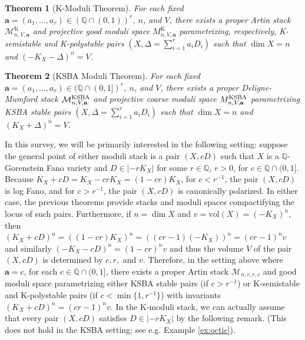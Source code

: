 \documentclass[11pt]{amsart}
\numberwithin{equation}{section}
\newtheorem{theorem}{Theorem}[section]
\theoremstyle{definition}
\newcommand{\bQ}{\mathbb{Q}}
\newcommand{\KSBA}{{\rm KSBA}}
\newcommand{\vol}{\mathrm{vol}}
\newcommand{\cM}{\mathcal M}
\newcommand{\K}{\mathrm{K}}
\begin{document}
\begin{theorem}[K-Moduli Theorem]\label{kmodthm}
    For each fixed $\mathbf{a} = (a_1, \dots, a_r) \in (\bQ\cap (0,1))^r$, $n$, and $V$, there exists a proper Artin stack $\cM^{\K}_{n,V,\mathbf{a}}$ and projective good moduli space $M^{\K}_{n,V,\mathbf{a}}$ parametrizing, respectively, K-semistable and K-polystable pairs $(X, \Delta = \sum_{i=1}^r a_i D_i)$ such that $\dim X = n$ and $(-K_X - \Delta)^n = V$.
\end{theorem}

\begin{theorem}[KSBA Moduli Theorem]\label{ksbamodthm}
    For each fixed $\mathbf{a} = (a_1, \dots, a_r) \in (\bQ\cap (0,1])^r$, $n$, and $V$, there exists a proper Deligne-Mumford stack $\cM^{\KSBA}_{n,V,\mathbf{a}}$ and projective coarse moduli space $M^{\KSBA}_{n,V,\mathbf{a}}$ parametrizing KSBA stable pairs $(X, \Delta = \sum_{i=1}^r a_i D_i)$ such that $\dim X = n$ and $(K_X + \Delta)^n = V$.
\end{theorem}

In this survey, we will be primarily interested in the following setting: suppose the general point of either moduli stack is a pair $(X,cD)$ such that $X$ is a $\bQ$-Gorenstein Fano variety and $D \in |- rK_X|$ for some $r \in \bQ$, $r > 0$, for $c \in \bQ \cap (0, 1]$.  Because $K_X + cD = K_X - cr K_X = (1- cr)K_X $, for $c  < r^{-1}$, the pair $(X,cD)$ is log Fano, and for $c > r^{-1}$, the pair $(X,cD)$ is canonically polarized.  In either case, the previous theorems provide stacks and moduli spaces compactifying the locus of such pairs.  Furthermore, if $n = \dim X$ and $v = \vol(X) = (-K_X)^n$, then $(K_X  + cD)^n = ((1-cr)K_X)^n = ((cr -1)(-K_X))^n = (cr-1)^n v$ and similarly $(-K_X -cD)^n = (1-cr)^n v$ and thus the volume $V$ of the pair $(X,cD)$ is determined by $c, r,$ and $v$.  Therefore, in the setting above where $\mathbf{a} = c$, for each $c \in \bQ \cap (0,1]$, there exists a proper Artin stack $\cM_{n,v,r,c}$ and good moduli space parametrizing either KSBA stable pairs (if $c > r^{-1}$) or K-semistable and K-polystable pairs (if $c < \min\{1, r^{-1}\}$) with invariants $(K_X + cD)^n = (cr-1)^n v$.  In the K-moduli stack, we can actually assume that every pair $(X,cD)$ satisfies $D \in |-rK_X|$ by the following remark.  (This does not hold in the KSBA setting; see e.g. Example \ref{ex:octic}).
\end{document}
